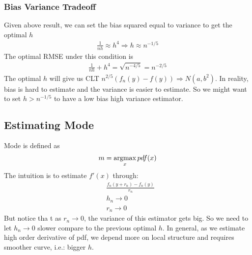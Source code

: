 \subsubsection{Bias Variance Tradeoff} 
Given above result, we can set the bias squared equal to variance to get the optimal $h$ 
    \begin{align*}
    \frac{1}{nh} \approx h^4 \Longrightarrow h \approx n^{-1/5}
    \end{align*}
The optimal RMSE under this condition is 
    \begin{align*}
        \frac{1}{nh} + h^4 = \sqrt{n^{-4/5}} = n^{-2/5}
    \end{align*}
The optimal $h$ will give us CLT $n^{2/5}(f_n(y)-f(y))\Rightarrow N(a, b^2)$. In reality, bias is hard to estimate and the variance is easier to estimate. So we might want to set $h > n^{-1/5}$ to have a low bias high variance estimator. 


\subsection{Estimating Mode} 
Mode is defined as 
    \begin{align*}
        m = \operatorname*{argmax}_x pdf(x)
    \end{align*}
The intuition is to estimate $f'(x)$ through: 
    \begin{align*}
        & \frac{f_n(y+r_n) - f_n(y)}{r_n}  \\
        & h_n \to 0 \tag{Used for estimate $f_n$} \\
        & r_n \to 0
    \end{align*}
But notice tha t as $r_n\to0$, the variance of this estimator gets big. So we need to let $h_n \to 0$ slower compare to the previous optimal $h$. In general, as we estimate high order derivative of pdf, we depend more on local structure and requires smoother curve, i.e.: bigger $h$. 


